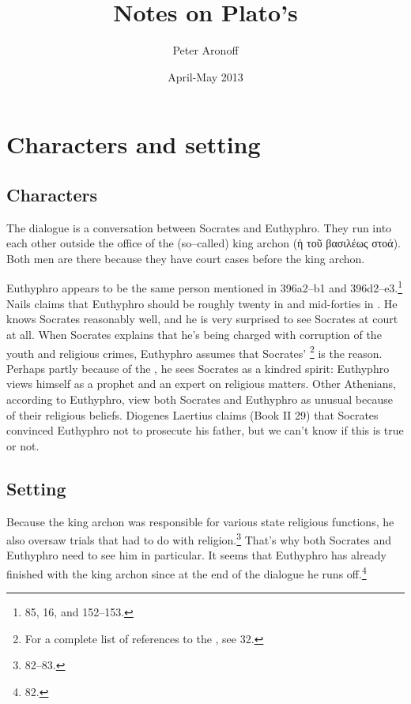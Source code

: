 \documentclass[11pt]{article}
\begin{document}
\begin{titlepage}
\title{Notes on Plato's }
\author{Peter Aronoff}
\date{April-May 2013}
\maketitle
\thispagestyle{empty}
\end{titlepage}

\section{Characters and setting}

\subsection{Characters}

The dialogue is a conversation between Socrates and Euthyphro.  They run into each other outside the office of the (so--called) king archon ({\g ἡ τοῦ βασιλέως στοά}).  Both men are there because they have court cases before the king archon.

Euthyphro appears to be the same person mentioned in  396a2--b1 and 396d2--e3.\footnote{\citet{burnet1924} 85, \citet{bailly2003} 16, and \citet{nails2002} 152--153.}  Nails claims that Euthyphro should be roughly twenty in  and mid-forties in . He knows Socrates reasonably well, and he is very surprised to see Socrates at court at all.  When Socrates explains that he's being charged with corruption of the youth and religious crimes, Euthyphro assumes that Socrates' \footnote{For a complete list of references to the , see \citet{bailly2003} 32.} is the reason.  Perhaps partly because of the , he sees Socrates as a kindred spirit: Euthyphro views himself as a prophet and an expert on religious matters.  Other Athenians, according to Euthyphro, view both Socrates and Euthyphro as unusual because of their religious beliefs. Diogenes Laertius claims (Book II 29) that Socrates convinced Euthyphro not to prosecute his father, but we can't know if this is true or not. 

\subsection{Setting}

Because the king archon was responsible for various state religious functions,
he also oversaw trials that had to do with
religion.\footnote{\citet{burnet1924} 82--83.}  That's why both Socrates and
Euthyphro need to see him in particular.  It seems that Euthyphro has already
finished with the king archon since at the end of the dialogue he runs
off.\footnote{\citet{burnet1924} 82.}
\end{document}
